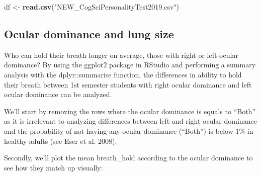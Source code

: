 \documentclass[]{article}
\newenvironment{Shaded}{\begin{snugshade}}{\end{snugshade}}
\newcommand{\DataTypeTok}[1]{\textcolor[rgb]{0.13,0.29,0.53}{#1}}
\newcommand{\FloatTok}[1]{\textcolor[rgb]{0.00,0.00,0.81}{#1}}
\newcommand{\KeywordTok}[1]{\textcolor[rgb]{0.13,0.29,0.53}{\textbf{#1}}}
\newcommand{\NormalTok}[1]{#1}
\newcommand{\OperatorTok}[1]{\textcolor[rgb]{0.81,0.36,0.00}{\textbf{#1}}}
\newcommand{\StringTok}[1]{\textcolor[rgb]{0.31,0.60,0.02}{#1}}
\begin{document}
\begin{Shaded}
\begin{Highlighting}[]
\NormalTok{df <-}\StringTok{ }\KeywordTok{read.csv}\NormalTok{(}\StringTok{"NEW_CogSciPersonalityTest2019.csv"}\NormalTok{)}
\end{Highlighting}
\end{Shaded}

\hypertarget{ocular-dominance-and-lung-size}{%
\subsection{Ocular dominance and lung size}\label{ocular-dominance-and-lung-size}}

Who can hold their breath longer on average, those with right or left ocular dominance? By using the ggplot2 package in RStudio and performing a summary analysis with the dplyr::summarise function, the differences in ability to hold their breath between 1st semester students with right ocular dominance and left ocular dominance can be analyzed.

We'll start by removing the rows where the ocular dominance is equals to ``Both'' as it is irrelevant to analyzing differences between left and right ocular dominance and the probability of not having any ocular dominance (``Both'') is below 1\% in healthy adults (see Eser et al. 2008).

\begin{Shaded}
\end{Shaded}

Secondly, we'll plot the mean breath\_hold according to the ocular dominance to see how they match up visually:

\begin{Shaded}
\end{Shaded}
\end{document}
